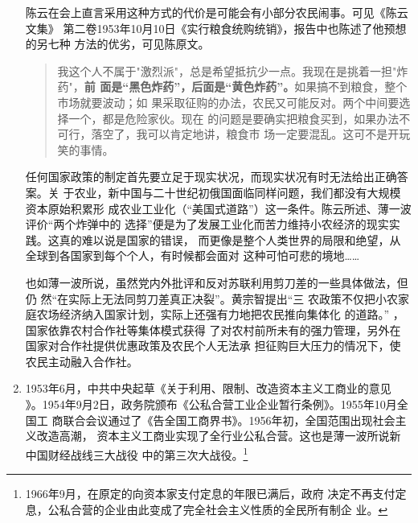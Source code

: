 \begin{enumerate}
  陈云在会上直言采用这种方式的代价是可能会有小部分农民闹事。可见《陈云文集》
  第二卷1953年10月10日《实行粮食统购统销》，报告中也陈述了他预想的另七种
  方法的优劣，可见陈原文。
  \begin{quotation}
    我这个人不属于"激烈派"，总是希望抵抗少一点。我现在是挑着一担"炸药"，\textbf{前
      面是“黑色炸药”，后面是“黄色炸药”。}如果搞不到粮食，整个市场就要波动；如
    果采取征购的办法，农民又可能反对。两个中间要选择一个，都是危险家伙。现在
    的问题是要确实把粮食买到，如果办法不可行，落空了，我可以肯定地讲，粮食市
    场一定要混乱。这可不是开玩笑的事情。
  \end{quotation}
  任何国家政策的制定首先要立足于现实状况，而现实状况有时无法给出正确答案。关
  于农业，新中国与二十世纪初俄国面临同样问题，我们都没有大规模资本原始积累形
  成农业工业化（“美国式道路”）这一条件。陈云所述、薄一波评价“两个炸弹中的
  选择”便是为了发展工业化而苦力维持小农经济的现实实践。这真的难以说是国家的错误，
  而更像是整个人类世界的局限和绝望，从全球到各国家到每个个人，有时候都会面对
  这种可怕可悲的境地……


  也如薄一波所说，虽然党内外批评和反对苏联利用剪刀差的一些具体做法，但仍
  然“在实际上无法同剪刀差真正决裂”。\cite[281]{boyibo}黄宗智提出“三
  农政策不仅把小农家庭农场经济纳入国家计划，实际上还强有力地把农民推向集体化
  的道路。”\cite[175]{sanjiaozhou} ，国家依靠农村合作社等集体模式获得
  了对农村前所未有的强力管理，另外在国家对合作社提供优惠政策及农民个人无法承
  担征购巨大压力的情况下，使农民主动融入合作社。

\item 1953年6月，中共中央起草《关于利用、限制、改造资本主义工商业的意见
  》。1954年9月2日，政务院颁布《公私合营工业企业暂行条例》。1955年10月全国工
  商联合会议通过了《告全国工商界书》。1956年初，全国范围出现社会主义改造高潮，
  资本主义工商业实现了全行业公私合营。这也是薄一波所说新中国财经战线三大战役
  中的第三次大战役。\footnote{1966年9月，在原定的向资本家支付定息的年限已满后，政府
    决定不再支付定息，公私合营的企业由此变成了完全社会主义性质的全民所有制企
    业。}




\end{enumerate}
